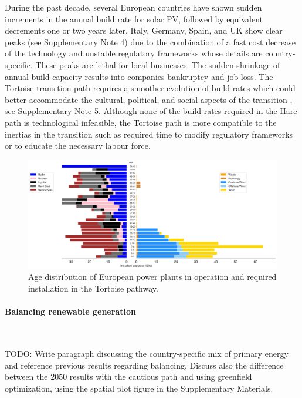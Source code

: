 \documentclass[5p]{elsarticle} %
\begin{document}
During the past decade, several European countries have shown sudden increments in the annual build rate for solar PV, followed by equivalent decrements one or two years later. Italy, Germany, Spain, and UK show clear peaks (see Supplementary Note 4)  due to the combination of a fast cost decrease of the technology and unstable regulatory frameworks whose details are country-specific. These peaks are lethal for local businesses. The sudden shrinkage of annual build capacity results into companies bankruptcy and job loss. The Tortoise transition path requires a smoother evolution of build rates which could better accommodate the cultural, political, and social aspects of the transition \cite{Geels_2017}, see Supplementary Note 5. Although none of the build rates required in the Hare path is technological infeasible, the Tortoise path is more compatible to the inertias in the transition such as required time to modify regulatory frameworks or to educate the necessary labour force. 


\begin{figure}[!h]
\centering
\includegraphics[width=\textwidth]{figures/age_distribution_2years_width.png}
\caption{Age distribution of European power plants in operation \cite{powerplantmatching, IRENA_2019} and required installation in the Tortoise pathway.} \label{fig_age_distribution} 
\end{figure}


\paragraph{\textbf{Balancing renewable generation}} \

\textcolor[rgb]{1,0,0}{TODO: Write paragraph discussing the country-specific mix of primary energy and reference previous results regarding balancing. Discuss also the difference between the 2050 results with the cautious path and using greenfield optimization, using the spatial plot figure in the Supplementary Materials.}
\end{document}
